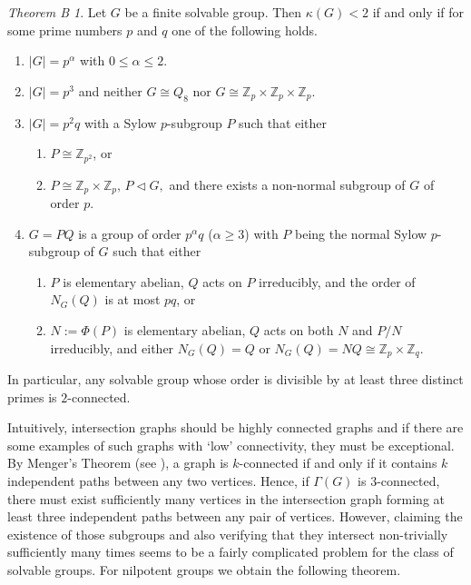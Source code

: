 \documentclass[a4paper,12pt]{article}
\theoremstyle{definition}
\theoremstyle{remark}
\theoremstyle{theorem}
\newtheorem*{theoremB}{Theorem B}
\begin{document}
\begin{theoremB}
  Let $G$ be a finite solvable group. Then $\kappa(G)<2$ if and only
  if for some prime numbers $p$ and $q$ one of the following holds.
  \begin{enumerate}
  \item $|G|=p^{\alpha}$ with $0\leq \alpha \leq 2$.
  \item $|G|=p^3$ and neither $G\cong Q_8$ nor
    $G\cong \mathbb{Z}_p\times\mathbb{Z}_p\times\mathbb{Z}_p$.
  \item $|G|=p^2q$ with a Sylow $p$-subgroup $P$ such that either
    \begin{enumerate}
    \item $P\cong\mathbb{Z}_{p^2}$, or
    \item $P\cong \mathbb{Z}_p\times\mathbb{Z}_p,\,P\triangleleft G,$ and there exists a non-normal subgroup of $G$ of order $p$.
    \end{enumerate}
  \item $G=PQ$ is a group of order $p^{\alpha}q$ ($\alpha\geq 3$) with
    $P$ being the normal Sylow $p$-subgroup of $G$ such that either
    \begin{enumerate}
    \item $P$ is elementary abelian, $Q$ acts on $P$ irreducibly, and
      the order of $N_G(Q)$ is at most $pq$, or
    \item $N:=\Phi(P)$ is elementary abelian, $Q$ acts on both $N$ and
      $P/N$ irreducibly, and either $N_G(Q)=Q$ or
      $N_G(Q)=NQ\cong\mathbb{Z}_p\times\mathbb{Z}_q$.
    \end{enumerate}
  \end{enumerate}
  In particular, any solvable group whose order is divisible by at least three distinct primes is $2$-connected.
\end{theoremB}

Intuitively, intersection graphs should be highly connected graphs and if there are some examples of such graphs with `low' connectivity, they must be exceptional. By Menger's Theorem (see \cite[Theorem 3.3.6]{Diestel2005}), a graph is $k$-connected if and only if it contains $k$ independent paths between any two vertices. Hence, if $\Gamma(G)$ is $3$-connected, there must exist sufficiently many vertices in the intersection graph forming at least three independent paths between any pair of vertices. However, claiming the existence of those subgroups and also verifying that they intersect non-trivially sufficiently many times seems to be a fairly complicated problem for the class of solvable groups. For nilpotent groups we obtain the following theorem.
\end{document}
